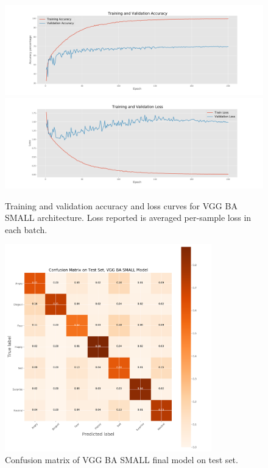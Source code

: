 \documentclass{article}
\begin{document}
\begin{figure}[]
    \centering
    \includegraphics[width=\textwidth]{figs/acc.pdf}
    \includegraphics[width=\textwidth]{figs/loss.pdf}
    \caption{Training and validation accuracy and loss curves for VGG BA SMALL architecture. Loss reported is averaged per-sample loss in each batch. }
    \label{fig:vgg ba small curves}
\end{figure}
\begin{figure}[]
    \centering
    \includegraphics[width=0.8\textwidth]{figs/confusion.pdf}
    \caption{Confusion matrix of VGG BA SMALL final model on test set. }
    \label{fig:vgg ba small confusion}
\end{figure}
\end{document}
